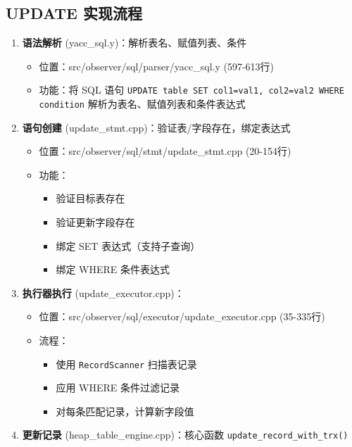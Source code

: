 \documentclass[a4paper, 12pt]{article}
\begin{document}
\subsection{UPDATE 实现流程}
\begin{enumerate}
    \item \textbf{语法解析} (yacc\_sql.y)：解析表名、赋值列表、条件
    \begin{itemize}
        \item 位置：src/observer/sql/parser/yacc\_sql.y (597-613行)
        \item 功能：将 SQL 语句 \texttt{UPDATE table SET col1=val1, col2=val2 WHERE condition} 解析为表名、赋值列表和条件表达式
    \end{itemize}
    
    \item \textbf{语句创建} (update\_stmt.cpp)：验证表/字段存在，绑定表达式
    
\begin{itemize}
        \item 位置：src/observer/sql/stmt/update\_stmt.cpp (20-154行)
        \item 功能：
        \begin{itemize}
            \item 验证目标表存在
            \item 验证更新字段存在
            \item 绑定 SET 表达式（支持子查询）
            \item 绑定 WHERE 条件表达式
        \end{itemize}
    \end{itemize}
    
    \item \textbf{执行器执行} (update\_executor.cpp)：
    
\begin{itemize}
        \item 位置：src/observer/sql/executor/update\_executor.cpp (35-335行)
        \item 流程：
        \begin{itemize}
            \item 使用 \texttt{RecordScanner} 扫描表记录
            \item 应用 WHERE 条件过滤记录
            \item 对每条匹配记录，计算新字段值
        \end{itemize}
    \end{itemize}
    
    \item \textbf{更新记录} (heap\_table\_engine.cpp)：核心函数 \texttt{update\_record\_with\_trx()}
    

\end{enumerate}
\end{document}
